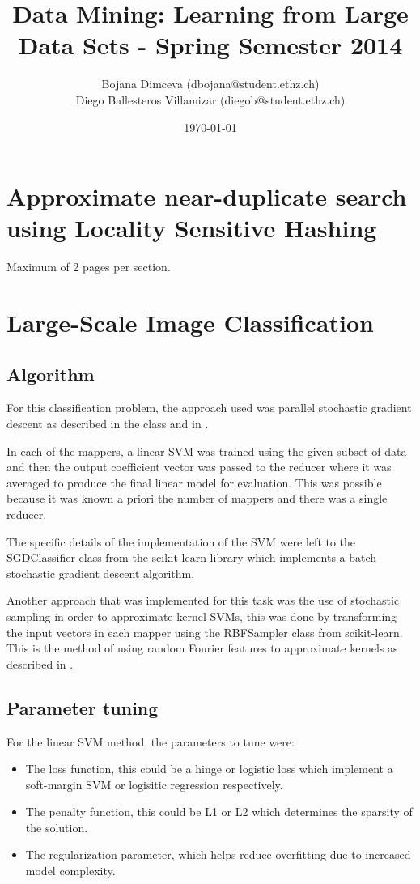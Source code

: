 \documentclass[a4paper, 11pt]{article}
\title{Data Mining: Learning from Large Data Sets - Spring Semester 2014}
\author{Bojana Dimceva (dbojana@student.ethz.ch)\\
	    Diego Ballesteros Villamizar (diegob@student.ethz.ch)\\}
\date{\today}
\begin{document}
\maketitle

\section{Approximate near-duplicate search using Locality Sensitive Hashing} 
Maximum of 2 pages per section.

\clearpage
\section{Large-Scale Image Classification}
\subsection{Algorithm}

For this classification problem, the approach used was parallel stochastic gradient descent as described in the class and in \cite{zinkevich2010parallelized}.

In each of the mappers, a linear SVM was trained using the given subset of data and then the output coefficient vector was passed to the reducer where it was averaged to produce the final linear model for evaluation. This was possible because it was known a priori the number of mappers and there was a single reducer.

The specific details of the implementation of the SVM were left to the SGDClassifier class from the scikit-learn library \cite{scikit-learn} which implements a batch stochastic gradient descent algorithm.

Another approach that was implemented for this task was the use of stochastic sampling in order to approximate kernel SVMs, this was done by transforming the input vectors in each mapper using the RBFSampler class from scikit-learn. This is the method of using random Fourier features to approximate kernels as described in \cite{rahimi2007random}.

\subsection{Parameter tuning}
For the linear SVM method, the parameters to tune were:
\begin{itemize}
	\item The loss function, this could be a hinge or logistic loss which implement a soft-margin SVM or logisitic regression respectively.
	\item The penalty function, this could be L1 or L2 which determines the sparsity of the solution.
	\item The regularization parameter, which helps reduce overfitting due to increased model complexity.
\end{itemize}
\end{document}
